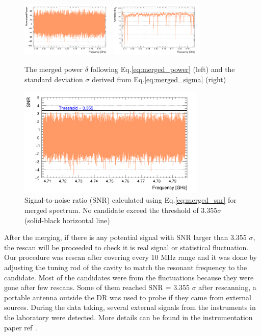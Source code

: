 \begin{figure}[h]
    \centering
    \includegraphics[width=0.4\textwidth,height = 0.3\textwidth]{figures/Power_GrandSpectrum_AxionRun_AllSteps_Rescan_Merged_5bin_SG4_W201_LqWeight.png}
    \includegraphics[width=0.4\textwidth,height = 0.3\textwidth]{figures/Sigma_GrandSpectrum_AxionRun_AllSteps_Rescan_Merged_5bin_SG4_W201_LqWeight.png}
    \caption{The merged power $\delta$ following Eq.\eqref{eq:merged_power} (left) and the standard deviation $\sigma$ derived from Eq.\eqref{eq:merged_sigma} (right)}
    \label{fig:power_sigma_merged}
\end{figure}

\begin{figure}[hbt!]
    \centering
    \includegraphics[width=0.8\textwidth,height=0.4\textwidth]{figures/SNR_GrandSpectrum_AxionRun_AllSteps_Rescan_Merged_5bin_SG4_W201_LqWeight.png}
    \caption{Signal-to-noise ratio (SNR) calculated using Eq.\eqref{eq:merged_snr} for merged spectrum. No candidate exceed the threshold of $3.355\sigma$ (solid-black horizontal line) }
    \label{fig:SNR_merged}
\end{figure}


After the merging, if there is any potential signal with SNR larger than 3.355 $\sigma$,
the rescan will be proceeded to check it is real signal or statistical fluctuation.
Our procedure was rescan after covering every 10 MHz range and it was done by adjusting
the tuning rod of the cavity to match the resonant frequency to the candidate.
Most of the candidates were from the fluctuations because they were gone after few rescans.
Some of them reached SNR = 3.355 $\sigma$ after rescanning, a portable antenna outside the DR was used
to probe if they came from external sources. During the data taking, several external signals from the instruments
in the laboratory were detected. More details can be found in the instrumentation paper ref~\cite{}.
